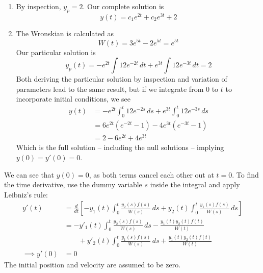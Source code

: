 \documentclass[a4paper]{article}
\begin{document}
\begin{enumerate}[label=\arabic*.]
	\item By inspection, \( y_{p } = 2 \). Our complete solution is
	\[
		y \!\left( t  \right) = c_{1}e^{2t} + c_{2}e^{3t} + 2 
	\]
	\item The Wronskian is calculated as 
	\[
		W \!\left( t  \right) = 3e^{5t} - 2e^{5t} = e^{5t} 
	\]
	Our particular solution is
	\[
		y_{p } \!\left( t  \right) = -e^{2t} \int 12 e^{-2t} \, dt + e^{3t} \int 12e^{-3t} \, dt = 2
	\]
	Both deriving the particular solution by inspection and variation of parameters lead to the same result, but if we integrate from \( 0 \) to \( t  \) to incorporate initial conditions, we see
	\begin{align*}
		y \!\left( t \right) & = -e^{2t} \int_{0}^{t} 12 e^{-2s} \, ds + e^{3t} \int_{0}^{t} 12e^{-3s} \, ds \\
		 & = 6e^{2t} \!\left( e^{-2t} - 1 \right) - 4e^{3t} \!\left( e^{-3t} - 1 \right) \\ 
		 & = 2 - 6e^{2t} + 4e^{3t}
	\end{align*}
	Which is the full solution -- including the null solutions -- implying \( y \!\left( 0 \right) = y'\!\left( 0 \right) = 0 \).
\end{enumerate}


We can see that \( y \!\left( 0 \right) = 0 \), as both terms cancel each other out at \( t = 0 \). To find the time derivative, use the dummy variable \( s  \) inside the integral and apply Leibniz's rule:
\begin{align*}
	y'\!\left( t  \right) & = \frac{d }{d t } \!\left[ -y_{1}\!\left( t  \right) \int_{0}^{t } \frac{y_{2}\!\left( s  \right)f \!\left( s  \right)}{W \!\left( s  \right)} \, ds + y_{2}\!\left( t  \right) \int_{0}^{t } \frac{y_{1}\!\left( s  \right) f \!\left( s  \right)}{W \!\left( s  \right)} \, ds \right] \\
	 & = -y'_{1}\!\left( t  \right) \int_{0}^{t } \frac{y_{2} \!\left( s  \right) f \!\left( s  \right)}{W \!\left( s  \right)} \, ds - \frac{y_{1}\!\left( t  \right) y_{2}\!\left( t  \right) f \!\left( t  \right)}{W \!\left( t  \right)}  \\ 
	 & \qquad + y'_{2} \!\left( t  \right) \int_{0}^{t } \frac{y_{1}\!\left( s  \right) f \!\left( s  \right)}{W \!\left( s  \right)} \, ds + \frac{y_{1} \!\left( t  \right) y_{2} \!\left( t  \right) f \!\left( t  \right)}{W \!\left( t  \right)} \\
	\implies y'\!\left( 0 \right) & = 0
\end{align*}
The initial position and velocity are assumed to be zero.
\end{document}
